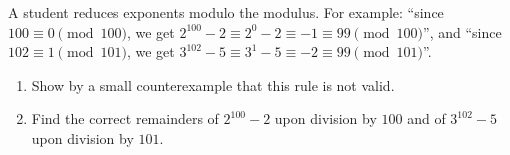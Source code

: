 A student reduces exponents modulo the modulus. For example: ``since $100\equiv0\pmod{100}$, we get $2^{100}-2\equiv2^0-2\equiv-1\equiv99\pmod{100}$'', and ``since $102\equiv1\pmod{101}$, we get $3^{102}-5\equiv3^1-5\equiv-2\equiv99\pmod{101}$''.
\begin{enumerate}
\item[(a)] Show by a small counterexample that this rule is not valid.
\item[(b)] Find the correct remainders of $2^{100}-2$ upon division by $100$ and of $3^{102}-5$ upon division by $101$.
\end{enumerate}
